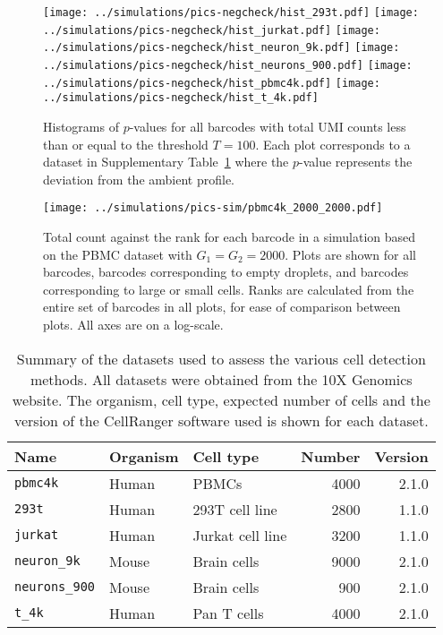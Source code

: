 \documentclass{article}
\newcommand{\code}[1]{\texttt{#1}}
\begin{document}
\newpage
\begin{figure}[btp]
    \begin{center}
        \texttt{[image: ../simulations/pics-negcheck/hist\_293t.pdf]}
        \texttt{[image: ../simulations/pics-negcheck/hist\_jurkat.pdf]}
        \texttt{[image: ../simulations/pics-negcheck/hist\_neuron\_9k.pdf]}
        \texttt{[image: ../simulations/pics-negcheck/hist\_neurons\_900.pdf]}
        \texttt{[image: ../simulations/pics-negcheck/hist\_pbmc4k.pdf]}
        \texttt{[image: ../simulations/pics-negcheck/hist\_t\_4k.pdf]}
    \end{center}
    \caption{Histograms of $p$-values for all barcodes with total UMI counts less than or equal to the threshold $T=100$.
        Each plot corresponds to a dataset in Supplementary Table~\ref{tab:datasets} where the $p$-value represents the deviation from the ambient profile.
    }
    \label{fig:negative}
\end{figure}

\begin{figure}[btp]
    \begin{center}
        \texttt{[image: ../simulations/pics-sim/pbmc4k\_2000\_2000.pdf]}
    \end{center}
\caption{Total count against the rank for each barcode in a simulation based on the PBMC dataset with $G_1=G_2=2000$.
Plots are shown for all barcodes, barcodes corresponding to empty droplets, and barcodes corresponding to large or small cells.
Ranks are calculated from the entire set of barcodes in all plots, for ease of comparison between plots.
All axes are on a log-scale.}
\end{figure}

\begin{table}[btp]
\caption{Summary of the datasets used to assess the various cell detection methods.
    All datasets were obtained from the 10X Genomics website.
The organism, cell type, expected number of cells and the version of the CellRanger software used is shown for each dataset.}
\begin{center}
\begin{tabular}{l l l r r}
\hline
\textbf{Name} & \textbf{Organism} & \textbf{Cell type} & \textbf{Number} & \textbf{Version} \\
\hline
\code{pbmc4k} & Human & PBMCs & 4000 & 2.1.0 \\
\code{293t}   & Human & 293T cell line & 2800 & 1.1.0 \\
\code{jurkat} & Human & Jurkat cell line & 3200 & 1.1.0 \\
\code{neuron\_9k} & Mouse & Brain cells & 9000 & 2.1.0 \\
\code{neurons\_900} & Mouse & Brain cells & 900 & 2.1.0 \\
\code{t\_4k} & Human & Pan T cells & 4000 & 2.1.0 \\
\hline
\end{tabular}
\end{center}
\label{tab:datasets}
\end{table}
\end{document}
